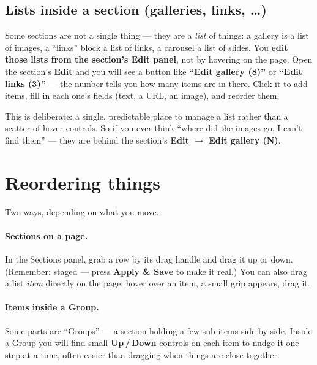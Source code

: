\documentclass[11pt]{article}
\begin{document}
\subsection{Lists inside a section (galleries, links, \dots)}

Some sections are not a single thing --- they are a \emph{list} of things: a gallery
is a list of images, a ``links'' block a list of links, a carousel a list of slides.
You \textbf{edit those lists from the section's Edit panel}, not by hovering on the
page. Open the section's \textbf{Edit} and you will see a button like \textbf{``Edit
gallery (8)''} or \textbf{``Edit links (3)''} --- the number tells you how many items
are in there. Click it to add items, fill in each one's fields (text, a URL, an
image), and reorder them.

This is deliberate: a single, predictable place to manage a list rather than a scatter
of hover controls. So if you ever think ``where did the images go, I can't find them''
--- they are behind the section's \textbf{Edit $\rightarrow$ Edit gallery (N)}.

\section{Reordering things}\label{sec:reorder}

Two ways, depending on what you move.

\paragraph{Sections on a page.} In the Sections panel, grab a row by its drag handle
and drag it up or down. (Remember: staged --- press \textbf{Apply \& Save} to make it
real.) You can also drag a list \emph{item} directly on the page: hover over an item,
a small grip appears, drag it.

\paragraph{Items inside a Group.} Some parts are ``Groups'' --- a section holding a few
sub-items side by side. Inside a Group you will find small \textbf{Up\,/\,Down}
controls on each item to nudge it one step at a time, often easier than dragging when
things are close together.

\end{document}
